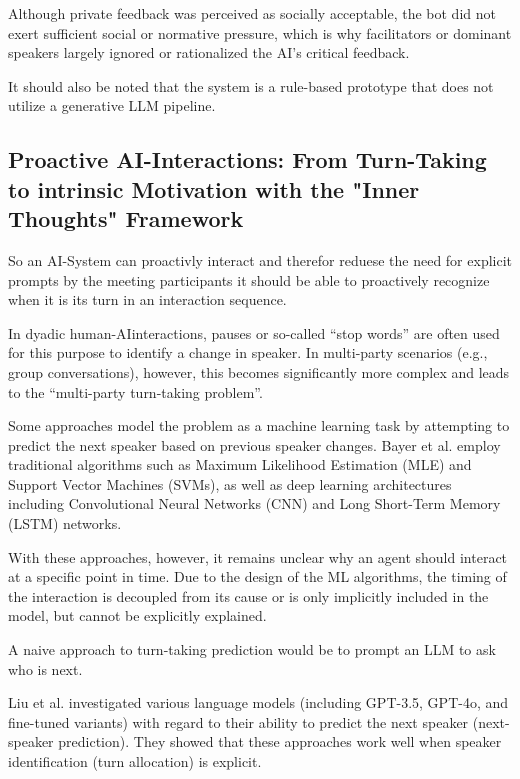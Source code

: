 Although private feedback was perceived as socially acceptable\cite[p.17]{houttiObserveAskIntervene2025},
the bot did not exert sufficient social or normative pressure, which is why facilitators or dominant speakers
largely ignored or rationalized the AI’s critical feedback.
\cite[p.18]{houttiObserveAskIntervene2025}

It should also be noted that the system is a rule-based prototype that does not utilize a generative LLM pipeline.

\subsection{Proactive AI-Interactions: From Turn-Taking to intrinsic Motivation with the "Inner Thoughts" Framework}
\label{sec:proactive-ai-interactions}

So an AI-System can proactivly interact and therefor reduese the need for explicit prompts by the meeting participants
it should be able to proactively recognize when it is its turn in an interaction sequence.

In dyadic human-AIinteractions, pauses or so-called “stop words” are often
used for this purpose to identify a change in speaker. In multi-party scenarios (e.g., group conversations),
however, this becomes significantly more complex and leads to the “multi-party turn-taking
problem”. \cite{sacksSimplestSystematicsOrganization1974}

Some approaches model the problem as a machine learning task by attempting to predict the next speaker based
on previous speaker changes.
\cite{bayserLearningMultiPartyTurnTaking2019}
Bayer et al. employ traditional algorithms such as Maximum Likelihood Estimation (MLE) and Support Vector
Machines (SVMs), as well as deep learning architectures including Convolutional Neural Networks (CNN) and
Long Short-Term Memory (LSTM) networks.

With these approaches, however, it remains unclear why an agent should interact at a specific point in time.
Due to the design of the ML algorithms, the timing of the interaction is decoupled from its cause or is only
implicitly included in the model, but cannot be explicitly explained.

A naive approach to turn-taking prediction would be to prompt an LLM to ask who is next.

Liu et al. investigated various language models (including GPT-3.5, GPT-4o, and fine-tuned variants) with
regard to their ability to predict the next speaker (next-speaker prediction). They showed that these
approaches work well when speaker identification (turn allocation) is explicit.
\cite[p.4]{liuProactiveConversationalAgents2025}

